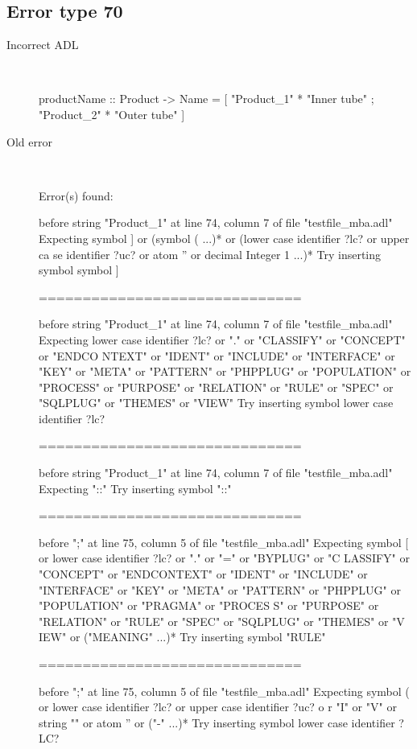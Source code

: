 \hrulefill

\subsection{Error type 70}
  \begin{description}
  \item[Incorrect ADL]~\\
\begin{adl}
productName :: Product -> Name
  = [ "Product_1" * "Inner tube"
    ; "Product_2" * "Outer tube"
    ]\end{adl}
  \item[Old error]~\\
\begin{haskell}
Error(s) found:

before string "Product_1" at line 74, column 7 of file "testfile_mba.adl"
Expecting symbol ] or (symbol ( ...)* or (lower case identifier ?lc? or upper ca
se identifier ?uc? or atom '' or decimal Integer 1 ...)*
Try inserting symbol symbol ]

==============================

before string "Product_1" at line 74, column 7 of file "testfile_mba.adl"
Expecting lower case identifier ?lc? or "." or "CLASSIFY" or "CONCEPT" or "ENDCO
NTEXT" or "IDENT" or "INCLUDE" or "INTERFACE" or "KEY" or "META" or "PATTERN" or
 "PHPPLUG" or "POPULATION" or "PROCESS" or "PURPOSE" or "RELATION" or "RULE" or
"SPEC" or "SQLPLUG" or "THEMES" or "VIEW"
Try inserting symbol lower case identifier ?lc?

==============================

before string "Product_1" at line 74, column 7 of file "testfile_mba.adl"
Expecting "::"
Try inserting symbol "::"

==============================

before ";" at line 75, column 5 of file "testfile_mba.adl"
Expecting symbol [ or lower case identifier ?lc? or "." or "=" or "BYPLUG" or "C
LASSIFY" or "CONCEPT" or "ENDCONTEXT" or "IDENT" or "INCLUDE" or "INTERFACE" or
"KEY" or "META" or "PATTERN" or "PHPPLUG" or "POPULATION" or "PRAGMA" or "PROCES
S" or "PURPOSE" or "RELATION" or "RULE" or "SPEC" or "SQLPLUG" or "THEMES" or "V
IEW" or ("MEANING" ...)*
Try inserting symbol "RULE"

==============================

before ";" at line 75, column 5 of file "testfile_mba.adl"
Expecting symbol ( or lower case identifier ?lc? or upper case identifier ?uc? o
r "I" or "V" or string "" or atom '' or ("-" ...)*
Try inserting symbol lower case identifier ?LC?


\end{haskell}
\end{description}
